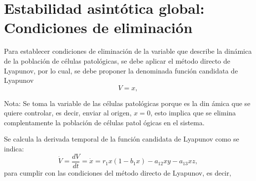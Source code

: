 \documentclass[letterpaper,11pt]{article}
\begin{document}
\section{Estabilidad asint\'{o}tica global: Condiciones de eliminaci\'{o}n}

Para establecer condiciones de eliminaci\'{o}n de la variable que describe
la din\'{a}mica de la poblaci\'{o}n de c\'{e}lulas patol\'{o}gicas, se debe
aplicar el m\'{e}todo directo de Lyapunov, por lo cual, se debe proponer la
denominada funci\'{o}n candidata de Lyapunov%
\begin{equation*}
V=x,
\end{equation*}

Nota: Se toma la variable de las c\'{e}lulas patol\'{o}gicas porque es la din%
\'{a}mica que se quiere controlar, es decir, enviar al origen, $x=0$, esto
implica que se elimina complentamente la poblaci\'{o}n de c\'{e}lulas patol%
\'{o}gicas en el sistema.

Se calcula la derivada temporal de la funci\'{o}n candidata de Lyapunov como
se indica:%
\begin{equation*}
\dot{V}=\frac{dV}{dt}=\dot{x}=r_{1}x\left( 1-b_{1}x\right)
-a_{12}xy-a_{13}xz,
\end{equation*}%
para cumplir con las condiciones del m\'{e}todo directo de Lyapunov, es
decir,
\end{document}
